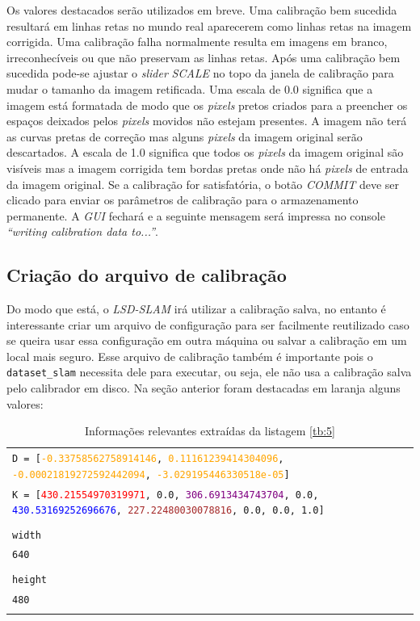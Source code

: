 

 
Os valores destacados serão utilizados em breve. Uma calibração bem sucedida resultará em linhas retas no mundo real aparecerem como linhas retas na imagem corrigida. Uma calibração falha normalmente resulta em imagens em branco, irreconhecíveis ou que não preservam as linhas retas.
Após uma calibração bem sucedida pode-se ajustar o \textit{slider} \textit{SCALE} no topo da janela de calibração para mudar o tamanho da imagem retificada. Uma escala de 0.0 significa que a imagem está formatada de modo que os \textit{pixels} pretos criados para a preencher os espaços deixados pelos \textit{pixels} movidos não estejam presentes. A imagem não terá as curvas pretas de correção mas alguns \textit{pixels} da imagem original serão descartados. A escala de 1.0 significa que todos os \textit{pixels} da imagem original são visíveis mas a imagem corrigida tem bordas pretas onde não há \textit{pixels} de entrada da imagem original.
Se a calibração for satisfatória, o botão \textit{COMMIT} deve ser clicado para enviar os parâmetros de calibração para o armazenamento permanente. A \textit{GUI} fechará e a seguinte mensagem será impressa no console \textit{“writing calibration data to...”}.

\subsection{Criação do arquivo de calibração}

Do modo que está, o \textit{LSD-SLAM} irá utilizar a calibração salva, no entanto é interessante criar um arquivo de configuração para ser facilmente reutilizado caso se queira usar essa configuração em outra máquina ou salvar a calibração em um local mais seguro. Esse arquivo de calibração também é importante pois o \texttt{dataset\_slam} necessita dele para executar, ou seja, ele não usa a calibração salva pelo calibrador em disco. Na seção anterior foram destacadas em laranja alguns valores:

\begin{table}[H]\label{tb:6}
\begin{tabular}{| p{\textwidth}|}
\hline
\texttt{D = [\textcolor{orange}{-0.33758562758914146}, \textcolor{orange}{0.11161239414304096}, \textcolor{orange}{-0.00021819272592442094}, \textcolor{orange}{-3.029195446330518e-05}]}\\
\texttt{K = [\textcolor{red}{430.21554970319971}, 0.0, \textcolor{purple}{306.6913434743704}, 0.0, \textcolor{blue}{430.53169252696676}, \textcolor{brown}{227.22480030078816}, 0.0, 0.0, 1.0]}\\
\\
\texttt{width}\\
\texttt{\textcolor{OliveGreen}{640}}\\
\\
\texttt{height}\\
\texttt{\textcolor{WildStrawberry}{480}}\\
\\
\hline
\end{tabular}
\caption{Informações relevantes extraídas da listagem \ref{tb:5}}
\end{table}


